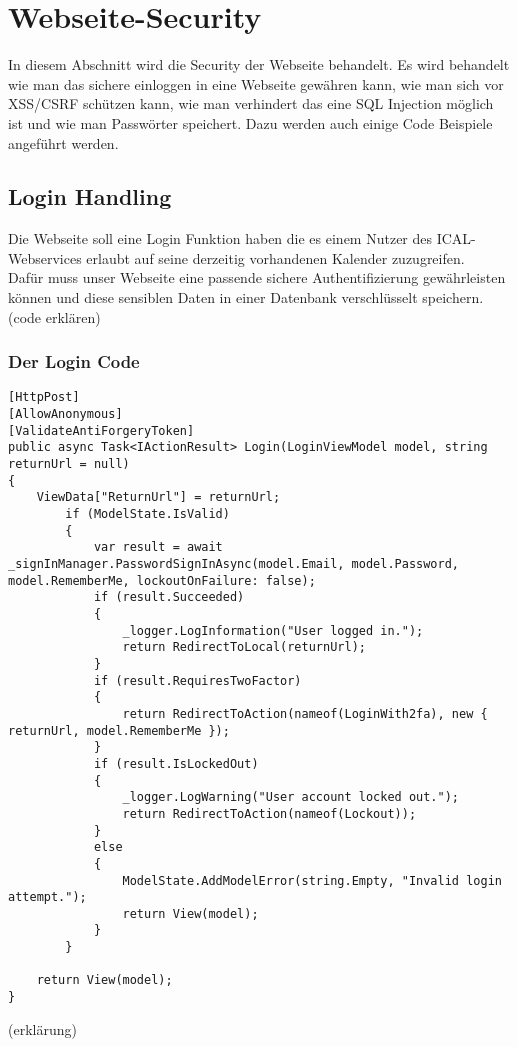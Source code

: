 \renewcommand{\theauthor}{Marcel Stering}
\chapter{Webseite-Security}
\label{sec:Security}
In diesem Abschnitt wird die Security der Webseite behandelt.
Es wird behandelt wie man das sichere einloggen in eine Webseite gewähren kann, 
wie man sich vor XSS/CSRF schützen kann, wie man verhindert das eine SQL Injection
möglich ist und wie man Passwörter speichert. Dazu werden auch einige Code Beispiele angeführt werden.
\section{Login Handling}
\label{sec:Login}
Die Webseite soll eine Login Funktion haben die es einem Nutzer des ICAL-Webservices erlaubt auf seine derzeitig vorhandenen Kalender zuzugreifen.\\Dafür muss unser Webseite eine passende sichere Authentifizierung gewährleisten können und diese sensiblen Daten in einer Datenbank verschlüsselt speichern. 
(code erklären)
\subsection{Der Login Code}
\label{sec:Login_Handling_Code}
\begin{lstlisting}
[HttpPost]
[AllowAnonymous]
[ValidateAntiForgeryToken]
public async Task<IActionResult> Login(LoginViewModel model, string returnUrl = null)
{
    ViewData["ReturnUrl"] = returnUrl;
        if (ModelState.IsValid)
        {
            var result = await _signInManager.PasswordSignInAsync(model.Email, model.Password, model.RememberMe, lockoutOnFailure: false);
            if (result.Succeeded)
            {
                _logger.LogInformation("User logged in.");
                return RedirectToLocal(returnUrl);
            }
            if (result.RequiresTwoFactor)
            {
                return RedirectToAction(nameof(LoginWith2fa), new { returnUrl, model.RememberMe });
            }
            if (result.IsLockedOut)
            {
                _logger.LogWarning("User account locked out.");
                return RedirectToAction(nameof(Lockout));
            }
            else
            {
                ModelState.AddModelError(string.Empty, "Invalid login attempt.");
                return View(model);
            }
        }

    return View(model);
}
\end{lstlisting}
(erklärung)
